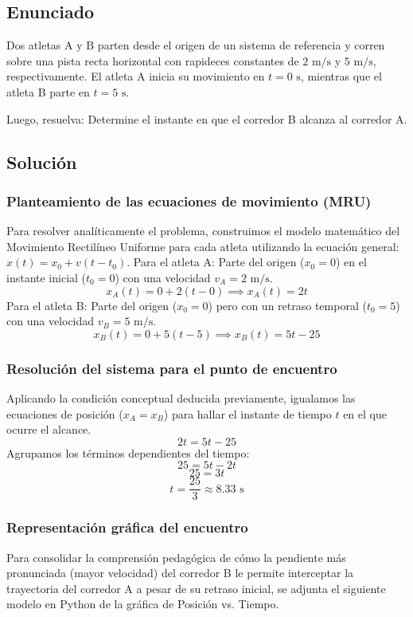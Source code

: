 \documentclass[12pt, a4paper]{article}
\begin{document}
\newpage
\subsection*{Enunciado}
Dos atletas A y B parten desde el origen de un sistema de referencia y corren sobre una pista recta horizontal con rapideces constantes de $2\text{ m/s}$ y $5\text{ m/s}$, respectivamente. El atleta A inicia su movimiento en $t = 0\text{ s}$, mientras que el atleta B parte en $t = 5\text{ s}$.

Luego, resuelva: Determine el instante en que el corredor B alcanza al corredor A.

\subsection*{Solución}

\subsubsection*{Planteamiento de las ecuaciones de movimiento (MRU)}
Para resolver analíticamente el problema, construimos el modelo matemático del Movimiento Rectilíneo Uniforme para cada atleta utilizando la ecuación general: $x(t) = x_0 + v(t - t_0)$.
Para el atleta A: Parte del origen ($x_0 = 0$) en el instante inicial ($t_0 = 0$) con una velocidad $v_A = 2\text{ m/s}$.
$$x_A(t) = 0 + 2(t - 0) \implies x_A(t) = 2t$$
Para el atleta B: Parte del origen ($x_0 = 0$) pero con un retraso temporal ($t_0 = 5$) con una velocidad $v_B = 5\text{ m/s}$.
$$x_B(t) = 0 + 5(t - 5) \implies x_B(t) = 5t - 25$$

\subsubsection*{Resolución del sistema para el punto de encuentro}
Aplicando la condición conceptual deducida previamente, igualamos las ecuaciones de posición ($x_A = x_B$) para hallar el instante de tiempo $t$ en el que ocurre el alcance.
$$2t = 5t - 25$$
Agrupamos los términos dependientes del tiempo:
$$25 = 5t - 2t$$
$$25 = 3t$$
$$t = \frac{25}{3} \approx 8.33\text{ s}$$

\subsubsection*{Representación gráfica del encuentro}
Para consolidar la comprensión pedagógica de cómo la pendiente más pronunciada (mayor velocidad) del corredor B le permite interceptar la trayectoria del corredor A a pesar de su retraso inicial, se adjunta el siguiente modelo en Python de la gráfica de Posición vs. Tiempo.
\end{document}
